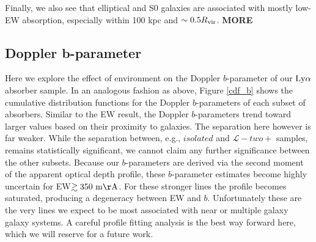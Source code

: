 \documentclass[twocolumn,tighten]{aastex62}
\begin{document}
Finally, we also see that elliptical and S0 galaxies are associated with mostly low-EW absorption, especially within 100 kpc and $\sim 0.5 R_{\rm vir}$. \textbf{MORE}



\subsection{Doppler b-parameter}

Here we explore the effect of environment on the Doppler $b$-parameter of our $\rm Ly\alpha$ absorber sample. In an analogous fashion as above, Figure \ref{cdf_b} shows the cumulative distribution functions for the Doppler $b$-parameters of each subset of absorbers. Similar to the EW result, the Doppler $b$-parameters trend toward larger values based on their proximity to galaxies. The separation here however is far weaker. While the separation between, e.g., $isolated$ and $\mathcal{L}-two+$ samples, remains statistically significant, we cannot claim any further significance between the other subsets. Because our $b$-parameters are derived via the second moment of the apparent optical depth profile, these $b$-parameter estimates become highly uncertain for EW$\rm \gtrsim 350~m\AA$. For these stronger lines the profile becomes saturated, producing a degeneracy between EW and $b$. Unfortunately these are the very lines we expect to be most associated with near or multiple galaxy galaxy systems. A careful profile fitting analysis is the best way forward here, which we will reserve for a future work.
\end{document}
